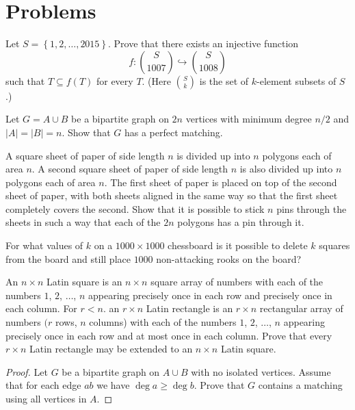 \documentclass[11pt]{article}
\begin{document}
\section{Problems}

\begin{problem}
	Let $S = \left\{ 1,2,\dots,2015 \right\}$.
Prove that there exists an injective function \[ f : \binom{S}{1007} \hookrightarrow \binom{S}{1008} \]
such that $T \subseteq f(T)$ for every $T$.
(Here $\binom Sk$ is the set of $k$-element subsets of $S$.)
\end{problem}

\begin{problem}
	Let $G = A \cup B$ be a bipartite graph on $2n$ vertices
	with minimum degree $n/2$ and $|A|=|B|=n$.
	Show that $G$ has a perfect matching.
\end{problem}

\begin{problem}
	A square sheet of paper of side length $n$ is divided up into $n$ polygons each of area $n$. A second square sheet of paper of side length $n$ is also divided up into $n$ polygons each of area $n$. The first sheet of paper is placed on top of the second sheet of paper, with both sheets aligned in the same way so that the first sheet completely covers the second. Show that it is possible to stick $n$ pins through the sheets in such a way that each of the $2 n$ polygons has a pin through it.
\end{problem}

\begin{problem}
	For what values of $k$ on a $1000 \times 1000$ chessboard is it possible to delete $k$ squares from the board and still place $1000$ non-attacking rooks on the board?
\end{problem}


\begin{problem}
	An $n \times n$ Latin square is an $n \times n$ square array of numbers with each of the numbers $1$, $2$, $\ldots$, $n$ appearing precisely once in each row and precisely once in each column. For $r<n$. an $r \times n$ Latin rectangle is an $r \times n$ rectangular array of numbers $(r$ rows, $n$ columns) with each of the numbers $1$, $2$, $\ldots$, $n$ appearing precisely once in each row and at most once in each column. Prove that every $r \times n$ Latin rectangle may be extended to an $n \times n$ Latin
	square.
\end{problem}

\begin{proof}
	Let $G$ be a bipartite graph on $A \cup B$ with no isolated vertices.
Assume that for each edge $ab$ we have $\deg a \geq \deg b$.
Prove that $G$ contains a matching using all vertices in $A$.
\end{proof}
\end{document}
